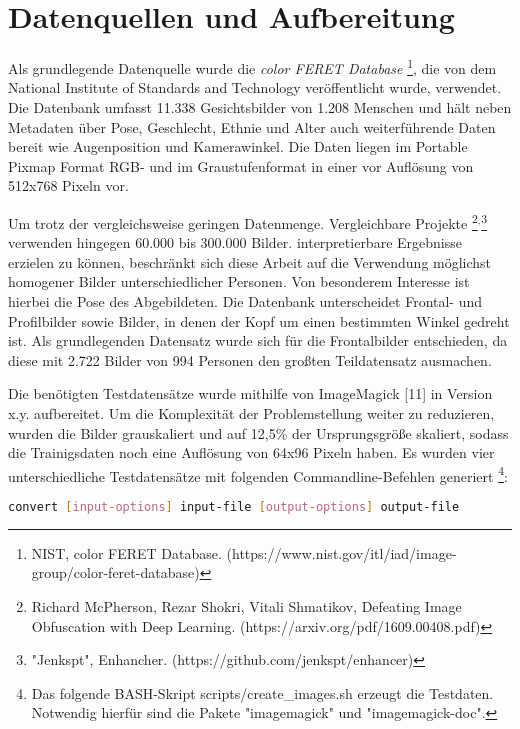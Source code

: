 \documentclass[
12pt, %
a4paper, %
oneside, %
headinclude,footinclude, %
BCOR5mm, %
german]{scrartcl}
\begin{document}
\section{Datenquellen und Aufbereitung}

Als grundlegende Datenquelle wurde die
\textit{color FERET Database} \footnote{NIST, color FERET Database. (https://www.nist.gov/itl/iad/image-group/color-feret-database)},
die von dem National Institute of Standards and Technology veröffentlicht wurde, verwendet.
Die Datenbank umfasst 11.338 Gesichtsbilder von 1.208 Menschen und
hält neben Metadaten über Pose, Geschlecht, Ethnie und Alter auch weiterführende Daten bereit wie Augenposition und
Kamerawinkel. Die Daten liegen im Portable Pixmap Format RGB- und im Graustufenformat in einer vor Auflösung von 512x768 Pixeln vor.

Um trotz der vergleichsweise geringen Datenmenge. Vergleichbare Projekte
\footnote{Richard McPherson, Rezar Shokri, Vitali Shmatikov, Defeating Image Obfuscation with Deep Learning. (https://arxiv.org/pdf/1609.00408.pdf)}$^{,}$\footnote{"Jenkspt", Enhancher. (https://github.com/jenkspt/enhancer)}
verwenden hingegen 60.000 bis 300.000 Bilder.
interpretierbare Ergebnisse erzielen zu können, beschränkt sich diese Arbeit auf
die Verwendung möglichst homogener Bilder unterschiedlicher Personen. Von besonderem Interesse ist hierbei die Pose des
Abgebildeten. Die Datenbank unterscheidet Frontal- und Profilbilder sowie Bilder, in denen der Kopf um einen bestimmten
Winkel gedreht ist. Als grundlegenden Datensatz wurde sich für die Frontalbilder entschieden, da diese mit 2.722 Bilder
von 994 Personen den großten Teildatensatz ausmachen.

Die benötigten Testdatensätze wurde mithilfe von ImageMagick [11] in Version x.y. aufbereitet. Um die Komplexität der
Problemstellung weiter zu reduzieren, wurden die Bilder grauskaliert und auf 12,5\% der Ursprungsgröße skaliert, sodass
die Trainigsdaten noch eine Auflösung von 64x96 Pixeln haben. Es wurden vier unterschiedliche Testdatensätze mit
folgenden Commandline-Befehlen generiert \footnote{Das folgende BASH-Skript scripts/create\_images.sh erzeugt die
Testdaten. Notwendig hierfür sind die Pakete "imagemagick" und "imagemagick-doc".}:

\begin{lstlisting}[language=bash,caption={convert - Synopsis}]
convert [input-options] input-file [output-options] output-file
\end{lstlisting}
\end{document}
